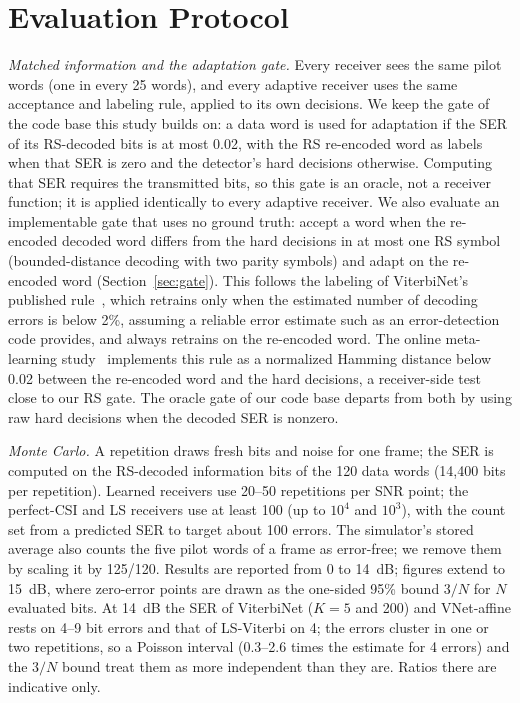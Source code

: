 \documentclass[journal]{IEEEtran}
\begin{document}
\section{Evaluation Protocol}\label{sec:protocol}
\emph{Matched information and the adaptation gate.} Every receiver sees the same pilot words (one in every 25 words), and every adaptive receiver uses the same acceptance and labeling rule, applied to its own decisions. We keep the gate of the code base this study builds on: a data word is used for adaptation if the SER of its RS-decoded bits is at most 0.02, with the RS re-encoded word as labels when that SER is zero and the detector's hard decisions otherwise. Computing that SER requires the transmitted bits, so this gate is an oracle, not a receiver function; it is applied identically to every adaptive receiver. We also evaluate an implementable gate that uses no ground truth: accept a word when the re-encoded decoded word differs from the hard decisions in at most one RS symbol (bounded-distance decoding with two parity symbols) and adapt on the re-encoded word (Section~\ref{sec:gate}). This follows the labeling of ViterbiNet's published rule~\cite[Alg.~2]{shlezinger2020viterbinet}, which retrains only when the estimated number of decoding errors is below 2\%, assuming a reliable error estimate such as an error-detection code provides, and always retrains on the re-encoded word. The online meta-learning study~\cite{raviv2023online} implements this rule as a normalized Hamming distance below 0.02 between the re-encoded word and the hard decisions, a receiver-side test close to our RS gate. The oracle gate of our code base departs from both by using raw hard decisions when the decoded SER is nonzero.

\emph{Monte Carlo.} A repetition draws fresh bits and noise for one frame; the SER is computed on the RS-decoded information bits of the 120 data words (14,400 bits per repetition). Learned receivers use 20--50 repetitions per SNR point; the perfect-CSI and LS receivers use at least 100 (up to $10^4$ and $10^3$), with the count set from a predicted SER to target about 100 errors. The simulator's stored average also counts the five pilot words of a frame as error-free; we remove them by scaling it by 125/120. Results are reported from 0 to 14~dB; figures extend to 15~dB, where zero-error points are drawn as the one-sided 95\% bound $3/N$ for $N$ evaluated bits. At 14~dB the SER of ViterbiNet ($K=5$ and 200) and VNet-affine rests on 4--9 bit errors and that of LS-Viterbi on 4; the errors cluster in one or two repetitions, so a Poisson interval (0.3--2.6 times the estimate for 4 errors) and the $3/N$ bound treat them as more independent than they are. Ratios there are indicative only.
\end{document}
